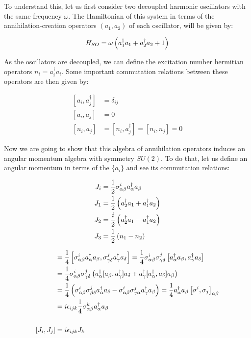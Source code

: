 To understand this, let us first consider two decoupled harmonic oscillators with the same frequency $\omega$. The Hamiltonian of this system in terms of the annihilation-creation operators $(a_1,a_2)$ of each oscillator, will be given by:

\begin{equation*}
H_{SO} = \omega\left( a_1^\dagger a_1 + a_2^\dagger a_2 + 1 \right)
\end{equation*}

As the oscillators are decoupled, we can define the excitation number hermitian operators $n_i = a_i^\dagger a_i$. Some important commutation relations between these operators are then given by:

\begin{align*}
\left[ a_i,a_j^\dagger\right] &= \delta_{ij}\\
\left[ a_i,a_j\right] &= 0\\
\left[ n_i, a_j \right] &= \left[ n_i, a_j^\dagger \right] = \left[ n_i, n_j \right] =0
\end{align*}
 
Now we are going to show that this algebra of annihilation operators induces an angular momentum algebra with symmetry $SU(2)$. To do that, let us define an angular momentum in terms of the $\{a_i\}$ and see its commutation relations:

\begin{equation}
\begin{aligned}
J_i &= \frac{1}{2}\sigma^i_{\alpha\beta}a^\dagger_\alpha a_\beta \\
J_1 &= \frac{1}{2} \left( a_2^\dagger a_1 + a_1^\dagger a_2 \right)\\
J_2 &= \frac{i}{2} \left( a_2^\dagger a_1 - a_1^\dagger a_2 \right)\\
J_3 &= \frac{1}{2} \left( n_1-n_2 \right)
\end{aligned}
\label{eq:schwingerAM}
\end{equation}

\begin{align*}
[J_i,J_j] &= \frac{1}{4}\left[ \sigma^i_{\alpha\beta}a^\dagger_\alpha a_\beta,\sigma^j_{\gamma\delta}a^\dagger_\gamma a_\delta \right] = \frac{1}{4}\sigma^i_{\alpha\beta}\sigma^j_{\gamma\delta}\left[ a^\dagger_\alpha a_\beta,a^\dagger_\gamma a_\delta \right]\\
&= \frac{1}{4}\sigma^i_{\alpha\beta}\sigma^j_{\gamma\delta}\roundP{a^\dagger_\alpha [a_\beta,a^\dagger_\gamma ]a_\delta +  a^\dagger_\gamma[a^\dagger_\alpha, a_\delta]a_\beta }\\
&= \frac{1}{4}\roundP{\sigma^i_{\alpha\beta}\sigma^j_{\beta\delta}a^\dagger_\alpha a_\delta - \sigma^i_{\alpha\beta}\sigma^j_{\gamma\alpha}a^\dagger_\gamma a_\beta } = \frac{1}{4}a^\dagger_\alpha a_\beta \left[ \sigma^i,\sigma_j \right]_{\alpha\beta}\\
&= i\epsilon_{ijk} \frac{1}{4} \sigma^k_{\alpha\beta}a^\dagger_\alpha a_\beta \\
\\
[J_i,J_j] &= i\epsilon_{ijk}J_k
\end{align*}

